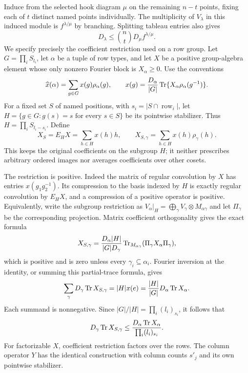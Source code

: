 Induce from the selected hook diagram $\mu$ on the remaining $n-t$
points, fixing each of $t$ distinct named points individually.  The
multiplicity of $V_\lambda$ in this induced module is
$f^{\lambda/\mu}$ by branching.  Splitting tableau entries also gives
\begin{equation}\label{rec:hook-induction-dimension}
 D_\lambda\le\binom nt D_\mu f^{\lambda/\mu}.
\end{equation}
We specify precisely the coefficient restriction used on a row
group.  Let $G=\prod_i S_{l_i}$, let $\alpha$ be a tuple of row
types, and let $X$ be a positive group-algebra element whose only
nonzero Fourier block is $X_\alpha\ge0$.  Use the conventions
\[
 \widehat x(\alpha)=\sum_{g\in G}x(g)\rho_\alpha(g),\qquad
 x(g)=\frac{D_\alpha}{|G|}
               \operatorname{Tr}\{X_\alpha\rho_\alpha(g^{-1})\}.
\]
For a fixed set $S$ of named positions, with
$s_i=|S\cap\operatorname{row}_i|$, let
$H=\{g\in G:g(s)=s\text{ for every }s\in S\}$ be its pointwise
stabilizer.  Thus $H=\prod_i S_{l_i-s_i}$.  Define
\begin{equation}\label{rec:stabilizer-expectation}
 X_S=E_HX=\sum_{h\in H}x(h)h,\qquad
 X_{S,\gamma}=\sum_{h\in H}x(h)\rho_\gamma(h).
\end{equation}
This keeps the original coefficients on the subgroup $H$; it
neither prescribes arbitrary ordered images nor averages coefficients
over other cosets.

The restriction is positive.  Indeed the matrix of regular convolution
by $X$ has entries $x(g_1g_2^{-1})$.  Its compression to the basis
indexed by $H$ is exactly regular convolution by $E_HX$, and a
compression of a positive operator is positive.  Equivalently,
write the subgroup restriction as
$V_\alpha|_H=\bigoplus_\gamma V_\gamma\otimes M_{\alpha\gamma}$
and let $\Pi_\gamma$ be the corresponding projection.  Matrix
coefficient orthogonality gives the exact formula
\[
 X_{S,\gamma}=
 \frac{D_\alpha|H|}{|G|D_\gamma}
 \operatorname{Tr}_{M_{\alpha\gamma}}
                  (\Pi_\gamma X_\alpha\Pi_\gamma),
\]
which is positive and is zero unless every
$\gamma_i\subseteq\alpha_i$.  Fourier inversion at the identity,
or summing this partial-trace formula, gives
\begin{equation}\label{rec:stabilizer-trace-identity}
 \sum_\gamma D_\gamma\operatorname{Tr} X_{S,\gamma}
 =|H|x(e)
 =\frac{|H|}{|G|}D_\alpha\operatorname{Tr} X_\alpha.
\end{equation}
Each summand is nonnegative.  Since
$|G|/|H|=\prod_i(l_i)_{s_i}$, it follows that
\begin{equation}\label{rec:coefficient-restriction}
 D_\gamma\operatorname{Tr} X_{S,\gamma}\le
 \frac{D_\alpha\operatorname{Tr} X_\alpha}{\prod_i(l_i)_{s_i}}.
\end{equation}
For factorizable $X$, coefficient restriction factors over the rows.
The column operator $Y$ has the identical construction with column
counts $s'_j$ and its own pointwise stabilizer.

